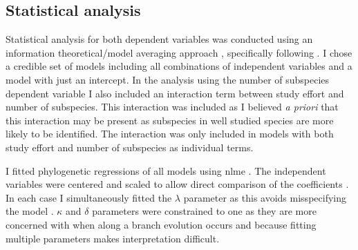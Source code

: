 


\subsection{Statistical analysis}

Statistical analysis for both dependent variables was conducted using an information theoretical/model averaging approach \cite{burnham2002model}, specifically following \textcite{whittingham2005habitat, whittingham2006we}.
I chose a credible set of models including all combinations of independent variables and a model with just an intercept.
In the analysis using the number of subspecies dependent variable I also included an interaction term between study effort and number of subspecies.
This interaction was included as I believed \emph{a priori} that this interaction may be present as subspecies in well studied species are more likely to be identified.
The interaction was only included in models with both study effort and number of subspecies as individual terms.

I fitted phylogenetic regressions of all models using nlme \cite{nlme}.
The independent variables were centered and scaled to allow direct comparison of the coefficients \cite{schielzeth2010simple}.
In each case I simultaneously fitted the $\lambda$ parameter as this avoids misspecifying the model \cite{revell2010phylogenetic}.
$\kappa$ and $\delta$ parameters were constrained to one as they are more concerned with when along a branch evolution occurs and because fitting multiple parameters makes interpretation difficult. 

